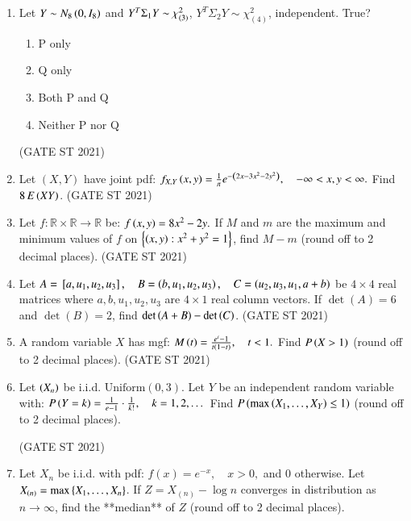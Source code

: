 \documentclass[journal,12pt,onecolumn]{IEEEtran}
\theoremstyle{remark}
\begin{document}
\begin{enumerate}
\item
Let $Y \sim N_8\left(0,I_8\right)$ and $Y^T\Sigma_1Y \sim \chi^2_{\left(3\right)}$, $Y^T\Sigma_2Y \sim \chi^2_{(4)}$, independent. True?
\begin{enumerate}
\item P only
\item Q only
\item Both P and Q
\item Neither P nor Q
\end{enumerate}
\hfill (GATE ST 2021) \\


\item
Let $(X,Y)$ have joint pdf:
$
f_{X,Y}\left(x,y\right) = \frac{1}{\pi} e^{-\left(2x - 3x^2 - 2y^2\right)}, \quad -\infty < x,y < \infty.
$
Find $8 \, E\left(XY\right)$.
\hfill (GATE ST 2021) \\

\item
Let $f: \mathbb{R} \times \mathbb{R} \to \mathbb{R}$ be:
$
f\left(x,y\right)= 8x^2 - 2y.
$
If $M$ and $m$ are the maximum and minimum values of $f$ on $\left\{ \left(x,y\right) : x^2 + y^2 = 1 \right\}$,  
find $M - m$ (round off to 2 decimal places).
\hfill (GATE ST 2021) \\


\item
Let 
$
A = {}\left[a, u_1, u_2, u_3\right], \quad
B = \left(b, u_1, u_2, u_3\right), \quad
C = \left(u_2, u_3, u_1, a+b\right)
$
be $4\times 4$ real matrices where $a,b,u_1,u_2,u_3$ are $4 \times 1$ real column vectors.  
If $\det(A) = 6$ and $\det(B) = 2$, find $\det\left(A+B\right) - \det\left(C\right)$.
\hfill (GATE ST 2021) \\
\item
A random variable $X$ has mgf:
$
M\left(t\right) = \frac{e^t - 1}{t\left(1-t\right)}, \quad t < 1.
$
Find $P\left(X > 1\right)$ (round off to 2 decimal places).
\hfill (GATE ST 2021) \\
\item
Let $\left( X_n \right)$ be i.i.d. $\text{Uniform}(0,3)$.  
Let $Y$ be an independent random variable with:
$
P\left(Y = k\right) = \frac{1}{e-1} \cdot \frac{1}{k!}, \quad k = 1,2,\dots
$
Find $P\left( \max\left( X_1,\dots,X_Y \right) \le 1 \right)$ (round off to 2 decimal places).

\hfill (GATE ST 2021) \\


\item
Let  $X_n$ be i.i.d. with pdf:
$
f(x) = e^{-x}, \quad x > 0,
$
and $0$ otherwise.  
Let $X_{(n)} = \max\left\{ X_1,\dots,X_n \right\}$. If 
$
Z = X_{(n)} - \log n
$
converges in distribution as $n \to \infty$, find the **median** of $Z$ (round off to 2 decimal places).


\end{enumerate}
\end{document}
